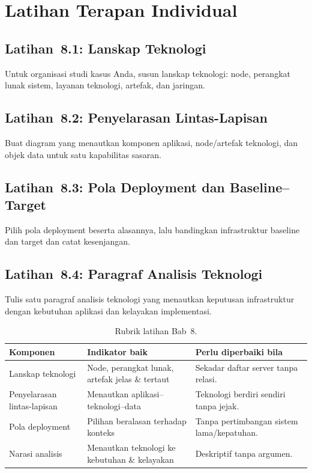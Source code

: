 \section{Latihan Terapan Individual}

\subsection*{Latihan~8.1: Lanskap Teknologi}
Untuk organisasi studi kasus Anda, susun lanskap teknologi: node, perangkat lunak
sistem, layanan teknologi, artefak, dan jaringan.

\subsection*{Latihan~8.2: Penyelarasan Lintas-Lapisan}
Buat diagram yang menautkan komponen aplikasi, node/artefak teknologi, dan objek
data untuk satu kapabilitas sasaran.

\subsection*{Latihan~8.3: Pola Deployment dan Baseline--Target}
Pilih pola deployment beserta alasannya, lalu bandingkan infrastruktur baseline
dan target dan catat kesenjangan.

\subsection*{Latihan~8.4: Paragraf Analisis Teknologi}
Tulis satu paragraf analisis teknologi yang menautkan keputusan infrastruktur
dengan kebutuhan aplikasi dan kelayakan implementasi.

\begin{table}[htbp]
\centering
\scriptsize
\caption{Rubrik latihan Bab~8.}
\label{tab:rubrik-bab7-tech}
\begin{tabularx}{\textwidth}{@{}p{} X X@{}}
\hline
\textbf{Komponen} & \textbf{Indikator baik} & \textbf{Perlu diperbaiki bila} \\
\hline
Lanskap teknologi & Node, perangkat lunak, artefak jelas \& tertaut & Sekadar
daftar server tanpa relasi. \\
Penyelarasan lintas-lapisan & Menautkan aplikasi--teknologi--data & Teknologi
berdiri sendiri tanpa jejak. \\
Pola deployment & Pilihan beralasan terhadap konteks & Tanpa pertimbangan sistem
lama/kepatuhan. \\
Narasi analisis & Menautkan teknologi ke kebutuhan \& kelayakan & Deskriptif tanpa
argumen. \\
\hline
\end{tabularx}
\end{table}

